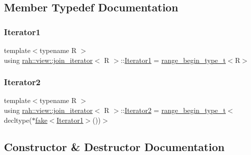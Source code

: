 \subsection{Member Typedef Documentation}
\mbox{\label{structrah_1_1view_1_1join__iterator_a8b71c6f25eee2915e2a8afc6e024196d}} 
\subsubsection{\texorpdfstring{Iterator1}{Iterator1}}
{\footnotesize\ttfamily template$<$typename R $>$ \\
using \mbox{\hyperlink{structrah_1_1view_1_1join__iterator}{rah\+::view\+::join\+\_\+iterator}}$<$ R $>$\+::\mbox{\hyperlink{structrah_1_1view_1_1join__iterator_a8b71c6f25eee2915e2a8afc6e024196d}{Iterator1}} =  \mbox{\hyperlink{namespacerah_a28aff4eeddcece6be65ff0b956d32d4a}{range\+\_\+begin\+\_\+type\+\_\+t}}$<$R$>$}

\mbox{\label{structrah_1_1view_1_1join__iterator_ae03a066174f3422c70d0e3c22e68d9f7}} 
\subsubsection{\texorpdfstring{Iterator2}{Iterator2}}
{\footnotesize\ttfamily template$<$typename R $>$ \\
using \mbox{\hyperlink{structrah_1_1view_1_1join__iterator}{rah\+::view\+::join\+\_\+iterator}}$<$ R $>$\+::\mbox{\hyperlink{structrah_1_1view_1_1join__iterator_ae03a066174f3422c70d0e3c22e68d9f7}{Iterator2}} =  \mbox{\hyperlink{namespacerah_a28aff4eeddcece6be65ff0b956d32d4a}{range\+\_\+begin\+\_\+type\+\_\+t}}$<$decltype($\ast$\mbox{\hyperlink{namespacerah_a11785bbdf970efa1bc57fc14993b77bf}{fake}}$<$\mbox{\hyperlink{structrah_1_1view_1_1join__iterator_a8b71c6f25eee2915e2a8afc6e024196d}{Iterator1}}$>$())$>$}



\subsection{Constructor \& Destructor Documentation}
\mbox{\label{structrah_1_1view_1_1join__iterator_a5a30ddd6e3809e32be7d6dc723c4afe5}} 
